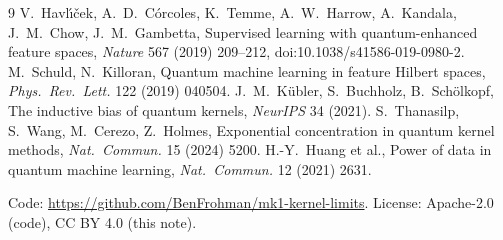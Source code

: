 \documentclass[11pt]{article}
\begin{document}
\begin{thebibliography}{9}
 V.~Havl\'{\i}\v{c}ek, A.~D.~C\'orcoles, K.~Temme, A.~W.~Harrow, A.~Kandala, J.~M.~Chow, J.~M.~Gambetta,
Supervised learning with quantum-enhanced feature spaces, \emph{Nature} 567 (2019) 209--212, doi:10.1038/s41586-019-0980-2.
 M.~Schuld, N.~Killoran, Quantum machine learning in feature Hilbert spaces, \emph{Phys.\ Rev.\ Lett.} 122 (2019) 040504.
 J.~M.~K\"ubler, S.~Buchholz, B.~Sch\"olkopf, The inductive bias of quantum kernels, \emph{NeurIPS} 34 (2021).
 S.~Thanasilp, S.~Wang, M.~Cerezo, Z.~Holmes, Exponential concentration in quantum kernel methods, \emph{Nat.\ Commun.} 15 (2024) 5200.
 H.-Y.~Huang et al., Power of data in quantum machine learning, \emph{Nat.\ Commun.} 12 (2021) 2631.
\end{thebibliography}
Code: \url{https://github.com/BenFrohman/mk1-kernel-limits}. License: Apache-2.0 (code), CC BY 4.0 (this note).
\end{document}
